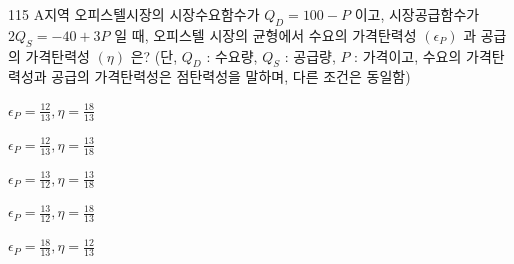 \begin{question}{115}
A지역 오피스텔시장의 시장수요함수가 $Q_{D}=100-P$ 이고, 시장공급함수가 $2Q_{S}=-40+3P$ 일 때, 오피스텔 시장의 균형에서 수요의 가격탄력성 $(\epsilon_{P})$ 과 공급의 가격탄력성 $(\eta )$ 은? (단, $Q_{D}$ : 수요량, $Q_{S}$ : 공급량, $P$ : 가격이고, 수요의 가격탄력성과 공급의 가격탄력성은 점탄력성을 말하며, 다른 조건은 동일함)
\begin{choices}
  \item $\epsilon_{P}=\frac{12}{13},\eta =\frac{18}{13}$
  \item $\epsilon_{P}=\frac{12}{13},\eta =\frac{13}{18}$
  \item $\epsilon_{P}=\frac{13}{12},\eta =\frac{13}{18}$
  \item $\epsilon_{P}=\frac{13}{12},\eta =\frac{18}{13}$
  \item $\epsilon_{P}=\frac{18}{13},\eta =\frac{12}{13}$
\end{choices}
\end{question}
